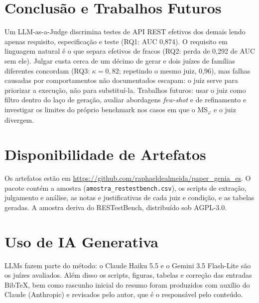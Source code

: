 \documentclass[sigconf,nonacm]{acmart}
\newcommand{\msphi}{MS$_\varphi$}
\begin{document}
\section{Conclusão e Trabalhos Futuros}
Um LLM-as-a-Judge discrimina testes de API REST efetivos dos demais lendo apenas requisito, especificação e
teste (RQ1: AUC 0,874). O requisito em linguagem natural é o que separa efetivos de fracos (RQ2: perda de
0,292 de AUC sem ele). Julgar custa cerca de um décimo de gerar e dois juízes de famílias diferentes
concordam (RQ3: $\kappa=0{,}82$; repetindo o mesmo juiz, 0,96), mas falhas causadas por comportamentos não documentados escapam: o juiz
serve para priorizar a execução, não para substituí-la. Trabalhos futuros: usar o juiz como filtro dentro do
laço de geração, avaliar abordagens \emph{few-shot} e de refinamento e investigar os limites do próprio benchmark nos casos em que o \msphi{} e o juiz divergem.

\section*{Disponibilidade de Artefatos}
Os artefatos estão em \url{https://github.com/raphaeldealmeida/paper_genia_es}. O pacote contém a amostra (\nolinkurl{amostra_restestbench.csv}), os scripts de
extração, julgamento e análise, as notas e justificativas de cada juiz e condição, e as tabelas geradas.
A amostra deriva do RESTestBench, distribuído sob AGPL-3.0.

\section*{Uso de IA Generativa}
LLMs fazem parte do método: o Claude Haiku 5.5 e o Gemini 3.5 Flash-Lite são os juízes avaliados. Além
disso os scripts, figuras, tabelas e correção das entradas BibTeX, 
bem como rascunho inicial do resumo foram produzidos com auxílio do Claude (Anthropic) e
revisados pelo autor, que é o responsável pelo conteúdo.



\end{document}
